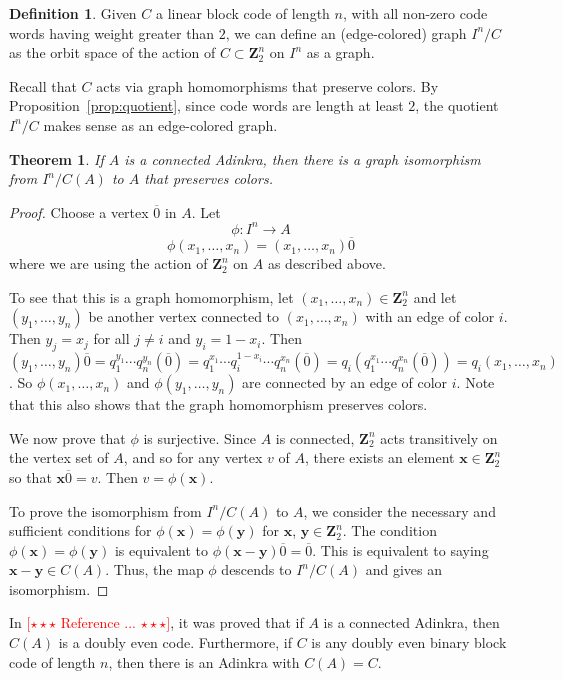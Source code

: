 \documentclass[12pt,twoside,singlespace]{article}
\numberwithin{equation}{section}
\newtheorem{thm}[equation]{Theorem}
\theoremstyle{definition}
\newtheorem{definition}[equation]{Definition}
\newcommand{\ZZ}{\mathbf{Z}}
\newcommand{\com}[1]{\textcolor{red}{$[\star \star \star$ #1 $\star \star \star]$}}
\renewcommand{\vec}[1]{\mathbf{#1}}
\begin{document}
\begin{definition}
Given $C$ a linear block code of length $n$, with all non-zero code words having weight greater than $2$, we can define an (edge-colored) graph $I^n/C$ as the orbit space of the action of $C\subset \ZZ_2^n$ on $I^n$ as a graph.
\end{definition}

Recall that $C$ acts via graph homomorphisms that preserve colors.  By Proposition~\ref{prop:quotient}, since code words are length at least $2$, the quotient $I^n/C$ makes sense as an edge-colored graph.

\begin{thm}
\label{thm:cubemodulocode}
If $A$ is a connected Adinkra, then there is a graph isomorphism from $I^n/C(A)$ to $A$ that preserves colors.
\end{thm}
\begin{proof}
Choose a vertex $\overline{0}$ in $A$.  Let
\[\phi:I^n\to A\]
\[\phi(x_1,\ldots,x_n)=(x_1,\ldots,x_n)\overline{0}\]
where we are using the action of $\ZZ_2^n$ on $A$ as described above.

To see that this is a graph homomorphism, let $(x_1,\ldots,x_n)\in\ZZ_2^n$ and let $(y_1,\ldots,y_n)$ be another vertex connected to $(x_1,\ldots,x_n)$ with an edge of color $i$.  Then $y_j=x_j$ for all $j\not=i$ and $y_i=1-x_i$.  Then $(y_1,\ldots,y_n)\overline{0}=q_1^{y_1}\cdots q_n^{y_n}(\overline{0}) =  q_1^{x_1}\cdots q_i^{1-x_i}\cdots q_n^{x_n}(\overline{0})=q_i(q_1^{x_1}\cdots q_n^{x_n}(\overline{0}))=q_i(x_1,\ldots,x_n)$.  So $\phi(x_1,\ldots,x_n)$ and $\phi(y_1,\ldots,y_n)$ are connected by an edge of color $i$.  Note that this also shows that the graph homomorphism preserves colors.

We now prove that $\phi$ is surjective.  Since $A$ is connected, $\ZZ_2^n$ acts transitively on the vertex set of $A$, and so for any vertex $v$ of $A$, there exists an element $\vec{x} \in\ZZ_2^n$ so that $\vec{x} \overline{0}=v$.  Then $v=\phi(\vec{x})$.

To prove the isomorphism from $I^n/C(A)$ to $A$, we consider the necessary and sufficient conditions for $\phi(\vec{x})=\phi(\vec{y})$ for $\vec{x}$, $\vec{y}\in \ZZ_2^n$.  The condition $\phi(\vec{x})=\phi(\vec{y})$ is equivalent to $\phi(\vec{x}-\vec{y})\overline{0}=\overline{0}$.  This is equivalent to saying $\vec{x}-\vec{y}\in C(A)$.  Thus, the map $\phi$ descends to $I^n/C(A)$ and gives an isomorphism.
\end{proof}

In \com{Reference ...}, it was proved that if $A$ is a connected Adinkra, then $C(A)$ is a doubly even code.  Furthermore, if $C$ is any doubly even binary block code of length $n$, then there is an Adinkra with $C(A)=C$.
\end{document}
